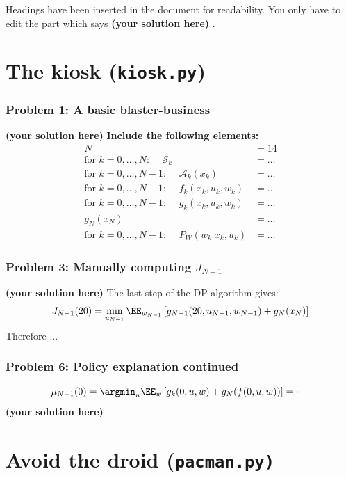 \documentclass[12pt,twoside]{article}
\newcommand\redt[1]{ {\textcolor[rgb]{0.60, 0.00, 0.00}{\textbf{ #1} } } }
\newcommand{\yoursolution}{ \redt{(your solution here) } }
\begin{document}

Headings have been inserted in the document for readability. You only have to edit the part which says \yoursolution. 

\section{The kiosk (\texttt{kiosk.py})}
\subsubsection*{{\color{red}Problem 1:  A basic blaster-business}}

\yoursolution 	
\redt{Include the following elements: \begin{align}
	N & = 14 \\
	\mbox{for $k=0,\dots,N$: }\quad	\mathcal{S}_k & = \dots \\
	\mbox{for $k=0,\dots,N-1$: }\quad \mathcal{A}_k(x_k) & = \dots \\
    \mbox{for $k=0,\dots,N-1$: }\quad f_k(x_k, u_k, w_k) & = \dots \\
	\mbox{for $k=0,\dots,N-1$: }\quad g_k(x_k, u_k, w_k) & = \dots \\
	g_N(x_N) & = \dots \\
    \mbox{for $k=0,\dots,N-1$: }\quad P_W(w_k | x_k, u_k) & = \dots
\end{align} }

\subsubsection*{{\color{red}Problem 3:  Manually computing $J_{N-1}$}}
		
	\yoursolution The last step of the DP algorithm gives:
	$$
	J_{N-1}(20)  = \min_{u_{N-1} } \EE_{w_{N-1} }\left[ g_{N-1}(20, u_{N-1}, w_{N-1} ) +  g_N(x_N) \right]
	$$
	Therefore ...
	
\subsubsection*{{\color{red}Problem 6:  Policy explanation continued}}
	
	$$\mu_{N-1}(0) = \argmin_u \EE_{w} \left[g_k(0, u, w) + g_N( f(0,u,w) ) \right] = \cdots $$
\yoursolution

\section{Avoid the droid (\texttt{pacman.py)}} 
\end{document}
